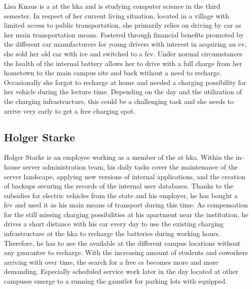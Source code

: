 Lisa Knaus is a  at the \acrshort{hka} and is studying computer science in the third semester. In respect of her current living situation, located in a village with limited access to public transportation, she primarily relies on driving by car as her main transportation means.
Fostered through financial benefits promoted by the different car manufacturers for young drivers with interest in acquiring an \acrshort{ev}, she sold her old car with \acrshort{ice} and switched to a \acrfull{fev}. 
Under normal circumstances the health of the internal battery allows her to drive with a full charge from her hometown to the main campus site and back without a need to recharge. Occasionally she forgot to recharge at home and needed a charging possibility for her vehicle during the lecture time.
Depending on the day and the utilization of the charging infrastructure, this could be a challenging task and she needs to arrive very early to get a free charging spot.

\subsection{Holger Starke}
\label{ch:Requirements Engineering:sec:Personas:ssec:Holger Starke}

Holger Starke is an employee working as a member of the  at \acrshort{hka}. Within the in-house server administration team, his daily tasks cover the maintenance of the server landscape, applying new versions of internal applications, and the creation of backups securing the records of the internal user databases. 
Thanks to the subsidies for electric vehicles from the state and his employer, he has bought a \acrshort{fev} and used it as his main means of transport during this time.
As compensation for the still missing charging possibilities at his apartment near the institution, he drives a short distance with his car every day to use the existing charging infrastructure at the \acrshort{hka} to recharge the batteries during working hours.
Therefore, he has to use the available  at the different campus locations without any guarantee to recharge. With the increasing amount of students and coworkers arriving with  over time, the search for a free \acrshort{cs} becomes more and more demanding.
Especially scheduled service work later in the day located at other campuses emerge to a running the gauntlet for parking lots with  equipped. 

